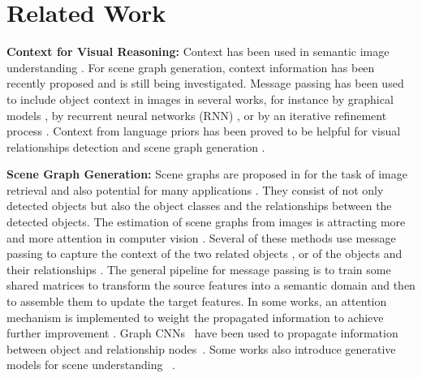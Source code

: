 \documentclass[runningheads]{llncs}
\begin{document}
\section{Related Work} 
\label{Sec:Related}

\noindent \textbf{Context for Visual Reasoning:} Context has been used in semantic image understanding 
\cite{divvala2009empirical,ladicky2010graph,yao2010modeling,hu2018relation,liu2018structure,Liao_2019_CVPR_Workshops}.
For scene graph generation, context information has been recently proposed and is still being investigated. 
Message passing has been used to include object context in images in several works, for instance by graphical models \cite{li2018factorizable,yang2018graph}, by recurrent neural networks (RNN) \cite{zellers2018neural,wang2019exploring}, or by an iterative refinement process \cite{xu2017scene,krishna2018referring}. 
Context from language priors \cite{mikolov2013efficient} has been proved to be helpful for visual relationships detection and scene graph generation \cite{lu2016visual,yu2017visual,li2017scene}.

\noindent \textbf{Scene Graph Generation:} Scene graphs are proposed in \cite{johnson2015image} for the task of image retrieval and also potential for many applications \cite{kluger2019temporally,reinders2019learning,kluger2020consac}. 
They consist of not only detected objects but also the object classes and the relationships between the detected objects. 
The estimation of scene graphs from images is attracting more and more attention in computer vision \cite{li2017scene,dai2017detecting,liang2017deep,zhuang2017towards,li2018factorizable,zellers2018neural,wang2019exploring,hu2019exploiting}. 
Several of these methods use message passing to capture the context of the two related objects \cite{li2017vip,zellers2018neural,wang2019exploring}, or of the objects and their relationships \cite{xu2017scene,li2017scene,li2018factorizable,yang2018graph}.
The general pipeline for message passing is to train some shared matrices to transform the source features into a semantic domain and then to assemble them to update the target features. 
In some works, an attention mechanism is implemented to weight the propagated information to achieve further improvement \cite{li2018factorizable,yang2018graph,herzig2018mapping,gkanatsios2019attention}. 
Graph CNNs~\cite{kipf2016semi} have been used to propagate information between object and relationship nodes~\cite{yang2018graph,chen2019knowledge}. Some works also introduce generative models for scene understanding ~\cite{chen2019scene,gu2019scene}. 
\end{document}
